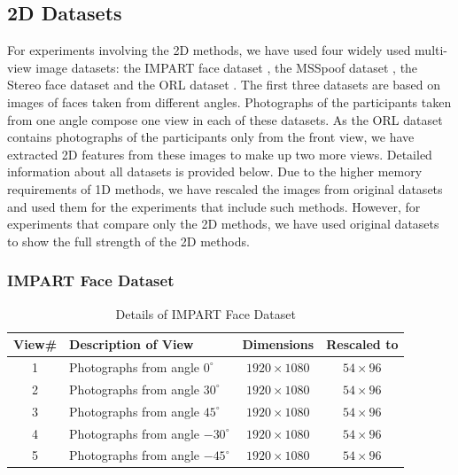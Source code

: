\subsection{2D Datasets}
\label{subs:2D_Data}
\hspace{0.8cm}For experiments involving the 2D methods, we have used four widely used multi-view image datasets: the IMPART face dataset \cite{KimEBH18}, the MSSpoof dataset \cite{ChingovskaEAM16}, the Stereo face dataset \cite{FransensSG05} and the ORL dataset \cite{ATnT-ORL}. The first three datasets are based on images of faces taken from different angles. Photographs of the participants taken from one angle compose one view in each of these datasets. As the ORL dataset contains photographs of the participants only from the front view, we have extracted 2D features from these images to make up two more views. Detailed information about all datasets is provided below. Due to the higher memory requirements of 1D methods, we have rescaled the images from original datasets and used them for the experiments that include such methods. However, for experiments that compare only the 2D methods, we have used original datasets to show the full strength of the 2D methods.



\subsubsection{IMPART Face Dataset}
\begin{table}[t]
	\centering
	\caption{Details of IMPART Face Dataset}
	\label{tab:IMPART}
	\begin{tabular}{c l c c} \toprule
		
		\textbf{View\#} & \textbf{Description of View} & \textbf{Dimensions} & \textbf{Rescaled to} \\ \midrule
		1 & Photographs from angle $0^{\circ}$ & $1920 \times 1080$ & $54 \times 96$ \\ 
		2 & Photographs from angle $30^{\circ}$ & $1920 \times 1080$ & $54 \times 96$ \\ 
		3 & Photographs from angle $45^{\circ}$ & $1920 \times 1080$ & $54 \times 96$ \\ 
		4 & Photographs from angle $-30^{\circ}$ & $1920 \times 1080$ & $54 \times 96$ \\ 
		5 & Photographs from angle $-45^{\circ}$ & $1920 \times 1080$ & $54 \times 96$ \\ \bottomrule
		
	\end{tabular}
\end{table}

